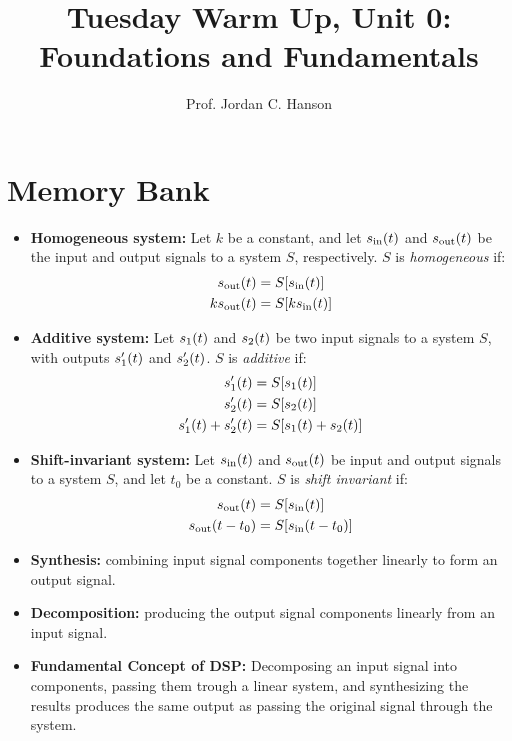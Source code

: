 \documentclass{article}
\begin{document}
\twocolumn

\title{Tuesday Warm Up, Unit 0: Foundations and Fundamentals}
\author{Prof. Jordan C. Hanson}
\maketitle

\section{Memory Bank}
\small
\begin{itemize}
\item \textbf{Homogeneous system:} Let $k$ be a constant, and let $s_{\rm in}(t)$ and $s_{\rm out}(t)$ be the input and output signals to a system $S$, respectively.  $S$ is \textit{homogeneous} if:
\begin{align}
s_{\rm out}(t) &= S[s_{\rm in}(t)] \\
k s_{\rm out}(t) &= S[k s_{\rm in}(t)]
\end{align}
\item \textbf{Additive system:} Let $s_{\rm 1}(t)$ and $s_{\rm 2}(t)$ be two input signals to a system $S$, with outputs $s'_{\rm 1}(t)$ and $s'_{\rm 2}(t)$.  $S$ is \textit{additive} if:
\begin{align}
s'_{\rm 1}(t) &= S[s_{\rm 1}(t)] \\
s'_{\rm 2}(t) &= S[s_{\rm 2}(t)] \\
s'_{\rm 1}(t)+s'_{\rm 2}(t) &= S[s_{\rm 1}(t)+s_{\rm 2}(t)]
\end{align}
\item \textbf{Shift-invariant system:} Let $s_{\rm in}(t)$ and $s_{\rm out}(t)$ be input and output signals to a system $S$, and let $t_0$ be a constant.  $S$ is \textit{shift invariant} if:
\begin{align}
s_{\rm out}(t) &= S[s_{\rm in}(t)] \\
s_{\rm out}(t-t_0) &= S[s_{\rm in}(t-t_0)]
\end{align}
\item \textbf{Synthesis:} combining input signal components together linearly to form an output signal.
\item \textbf{Decomposition:} producing the output signal components linearly from an input signal.
\item \textbf{Fundamental Concept of DSP:} Decomposing an input signal into components, passing them trough a linear system, and synthesizing the results produces the same output as passing the original signal through the system.

\end{itemize}
\end{document}
